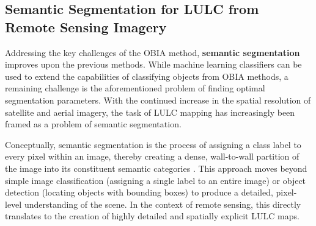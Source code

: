 \documentclass{report}
\begin{document}
\subsection{Semantic Segmentation for LULC from Remote Sensing Imagery}
Addressing the key challenges of the OBIA method, \textbf{semantic segmentation} improves upon the previous methods. While machine learning classifiers can be used to extend the capabilities of classifying objects from OBIA methods, a remaining challenge is the aforementioned problem of finding optimal segmentation parameters. With the continued increase in the spatial resolution of satellite and aerial imagery, the task of LULC mapping has increasingly been framed as a problem of semantic segmentation.
\par
Conceptually, semantic segmentation is the process of assigning a class label to every pixel within an image, thereby creating a dense, wall-to-wall partition of the image into its constituent semantic categories \parencites[p.~311;]{KotaridisLazaridouRemotesensingimagesegmentationadvancesmetaanalysis2021a}[p.~2]{LeiEtAlDeeplearningimplementationimagesegmentationagriculturalapplicationscomprehensivereview2024}. This approach moves beyond simple image classification (assigning a single label to an entire image) or object detection (locating objects with bounding boxes) to produce a detailed, pixel-level understanding of the scene. In the context of remote sensing, this directly translates to the creation of highly detailed and spatially explicit LULC maps.
\end{document}
